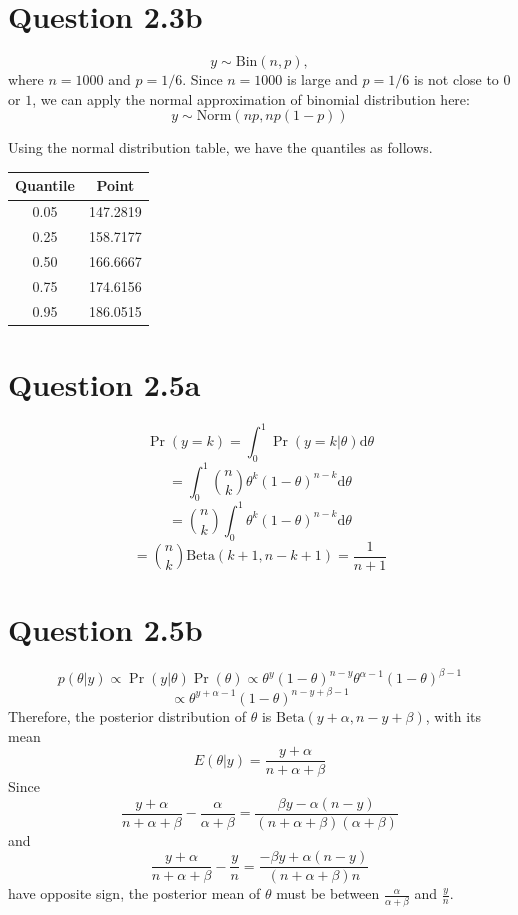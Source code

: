 \documentclass{article}
\begin{document}
\section*{Question 2.3b}
{
    $$y \sim \mathrm{Bin}(n, p),$$ where $n=1000$ and $p=1/6$. Since $n=1000$ is large and $p=1/6$ is not close to $0$ or $1$, we can apply the normal approximation of binomial distribution here: $$y \sim \mathrm{Norm}(np, np(1-p))$$

    Using the normal distribution table, we have the quantiles as follows.

    \begin{table}[!hbp]
        \begin{tabular}{|c|c|}
        \hline
        Quantile & Point \\
        \hline
        0.05 & 147.2819 \\
        \hline
        0.25 & 158.7177 \\
        \hline
        0.50 & 166.6667 \\
        \hline
        0.75 & 174.6156 \\
        \hline
        0.95 & 186.0515 \\
        \hline
        \end{tabular}
    \end{table}
}

\section*{Question 2.5a}
{
    $$\Pr{(y=k)} = \int_0^1 {\Pr{(y=k | \theta)}\mathrm{d}\theta}$$
    $$= \int_0^1 {\binom{n}{k} \theta^{k} (1-\theta)^{n-k}\mathrm{d}\theta}$$
    $$= \binom{n}{k} \int_0^1 {\theta^{k} (1-\theta)^{n-k}\mathrm{d}\theta}$$
    $$= \binom{n}{k} \mathrm{Beta}(k+1, n-k+1) = \frac{1}{n+1}$$
}

\section*{Question 2.5b}
{
    $$p(\theta | y) \propto \Pr{(y | \theta)} \Pr{(\theta)} \propto \theta^{y} (1-\theta)^{n-y} \theta^{\alpha-1} (1-\theta)^{\beta-1}$$
    $$\propto \theta^{y+\alpha-1} (1-\theta)^{n-y+\beta-1}$$
    Therefore, the posterior distribution of $\theta$ is $\mathrm{Beta}(y+\alpha, n-y+\beta)$, with its mean
    $$E(\theta | y) = \frac{y+\alpha}{n+\alpha+\beta}$$
    Since
    $$\frac{y+\alpha}{n+\alpha+\beta} - \frac{\alpha}{\alpha+\beta} = \frac{\beta y - \alpha (n-y)}{(n+\alpha+\beta)(\alpha+\beta)}$$
    and
    $$\frac{y+\alpha}{n+\alpha+\beta} - \frac{y}{n} = \frac{-\beta y + \alpha (n-y)}{(n+\alpha+\beta)n}$$
    have opposite sign, the posterior mean of $\theta$ must be between $\frac{\alpha}{\alpha+\beta}$ and $\frac{y}{n}$.
    
}
\end{document}
